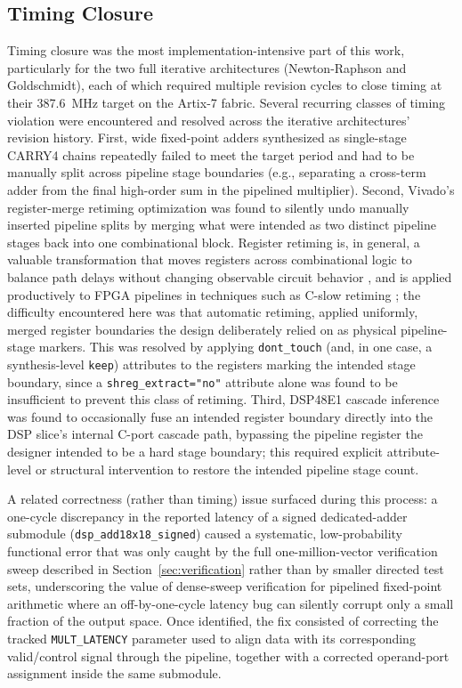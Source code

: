 \documentclass[manuscript,screen,review]{acmart}
\begin{document}
\subsection{Timing Closure}
\label{sec:timing-closure}

Timing closure was the most implementation-intensive part of this work, particularly for the two full iterative architectures (Newton-Raphson and Goldschmidt), each of which required multiple revision cycles to close timing at their 387.6~MHz target on the Artix-7 fabric. Several recurring classes of timing violation were encountered and resolved across the iterative architectures' revision history. First, wide fixed-point adders synthesized as single-stage CARRY4 chains repeatedly failed to meet the target period and had to be manually split across pipeline stage boundaries (e.g., separating a cross-term adder from the final high-order sum in the pipelined multiplier). Second, Vivado's register-merge retiming optimization was found to silently undo manually inserted pipeline splits by merging what were intended as two distinct pipeline stages back into one combinational block. Register retiming is, in general, a valuable transformation that moves registers across combinational logic to balance path delays without changing observable circuit behavior \cite{LeisersonSaxe91}, and is applied productively to FPGA pipelines in techniques such as C-slow retiming \cite{WeaverMarkovskiyPatelWawrzynek03}; the difficulty encountered here was that automatic retiming, applied uniformly, merged register boundaries the design deliberately relied on as physical pipeline-stage markers. This was resolved by applying \texttt{dont\_touch} (and, in one case, a synthesis-level \texttt{keep}) attributes to the registers marking the intended stage boundary, since a \texttt{shreg\_extract="no"} attribute alone was found to be insufficient to prevent this class of retiming. Third, DSP48E1 cascade inference was found to occasionally fuse an intended register boundary directly into the DSP slice's internal C-port cascade path, bypassing the pipeline register the designer intended to be a hard stage boundary; this required explicit attribute-level or structural intervention to restore the intended pipeline stage count.

A related correctness (rather than timing) issue surfaced during this process: a one-cycle discrepancy in the reported latency of a signed dedicated-adder submodule (\texttt{dsp\_add18x18\_signed}) caused a systematic, low-probability functional error that was only caught by the full one-million-vector verification sweep described in Section~\ref{sec:verification} rather than by smaller directed test sets, underscoring the value of dense-sweep verification for pipelined fixed-point arithmetic where an off-by-one-cycle latency bug can silently corrupt only a small fraction of the output space. Once identified, the fix consisted of correcting the tracked \texttt{MULT\_LATENCY} parameter used to align data with its corresponding valid/control signal through the pipeline, together with a corrected operand-port assignment inside the same submodule.
\end{document}
